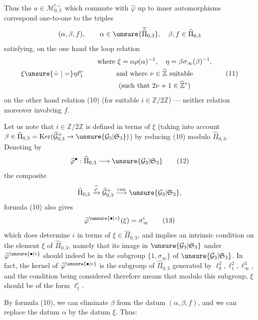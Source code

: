 Thus the $u\in\mathcal M_{0,3}^{!\sim}$ which commute with
$\widehat\varphi$ up to inner automorphisms correspond one-to-one to the
 triples 
\[
(\alpha,\beta,f),\qquad
\alpha\in\unsure{\widetilde{\widehat\Pi}_{0,3}},\quad
\beta,f\in\widehat\Pi_{0,3}
\]
satisfying, on the one hand the loop relation
\[
\xi\unsure{\doteq|=}\eta\ell_1^\nu
\qquad
\begin{gathered}
\text{where }\xi=\alpha\rho(\alpha)^{-1},\quad
\eta=\beta\sigma_\infty(\beta)^{-1},\\
\text{and where }\nu\in\widehat{\mathbb Z}\ \text{suitable}\\
(\text{such that }2\nu+1\in\widehat{\mathbb Z}^{*})
\end{gathered}
\tag{11}
\]
on the other hand relation (10) (for suitable $i\in\mathbb Z/2\mathbb Z$)
--- neither relation moreover involving $f$.


Let us note that $i\in\mathbb Z/2\mathbb Z$ is defined in terms of
$\xi$ (taking into account
$\beta\in\widehat\Pi_{0,3}=\operatorname{Ker}
(\widehat{\mathcal G}_{0,3}^{+}\to\unsure{\mathcal G_3|\mathfrak S_3})$)
by reducing (10) modulo $\widehat\Pi_{0,3}$. Denoting by
\[
\widehat\varphi^{\bullet}:
\widehat\Pi_{0,3}\longrightarrow\unsure{\mathcal G_3|\mathfrak S_3}
\tag{12}
\]
the composite
\[
\widehat\Pi_{0,3}\xrightarrow{\widehat\varphi}
\widehat{\mathcal G}_{0,3}^{+}
\overset{\mathrm{can}}{\longrightarrow}
\unsure{\mathcal G_3|\mathfrak S_3},
\]
formula (10) also gives
\[
\widehat\varphi^{\unsure{\bullet|\circ}}(\xi)=\sigma_\infty^i
\tag{13}
\]
which does determine $i$ in terms of
$\xi\in\widehat\Pi_{0,3}$, and implies an intrinsic condition on
the element $\xi$ of $\widehat\Pi_{0,3}$, namely that its image in
$\unsure{\mathcal G_3|\mathfrak S_3}$ under
$\widehat\varphi^{\unsure{\bullet|\circ}}$ should indeed be in the subgroup
$\{1,\sigma_\infty\}$ of $\unsure{\mathcal G_3|\mathfrak S_3}$.
In fact, the kernel of $\widehat\varphi^{\unsure{\bullet|\circ}}$ is
the  subgroup of $\widehat\Pi_{0,3}$ generated by
$\ell_0^2,\ell_1^2,\ell_\infty^3$, and the condition being considered
therefore means that modulo this subgroup, $\xi$ should be of the form $\ell_1^i$.

By formula (10), we can eliminate $\beta$ from the datum
$(\alpha,\beta,f)$, and we can replace the datum $\alpha$ by the datum
$\xi$. Thus:

